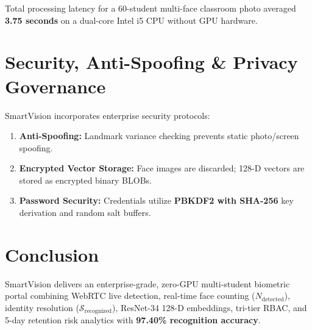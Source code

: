 \documentclass[10pt,journal,compsoc,twocolumn,a4paper]{IEEEtran}
\begin{document}
\begin{table}[htbp]
\caption{Recognition Accuracy \& Latency Across Environmental Scenarios}
\label{tab:results}
\centering
{}
\end{table}

Total processing latency for a 60-student multi-face classroom photo averaged \textbf{3.75 seconds} on a dual-core Intel i5 CPU without GPU hardware.

\section{Security, Anti-Spoofing \& Privacy Governance}
SmartVision incorporates enterprise security protocols:
\begin{enumerate}
    \item \textbf{Anti-Spoofing:} Landmark variance checking prevents static photo/screen spoofing.
    \item \textbf{Encrypted Vector Storage:} Face images are discarded; 128-D vectors are stored as encrypted binary BLOBs.
    \item \textbf{Password Security:} Credentials utilize \textbf{PBKDF2 with SHA-256} key derivation and random salt buffers.
\end{enumerate}

\section{Conclusion}
SmartVision delivers an enterprise-grade, zero-GPU multi-student biometric portal combining WebRTC live detection, real-time face counting ($N_{\text{detected}}$), identity resolution ($\mathcal{S}_{\text{recognized}}$), ResNet-34 128-D embeddings, tri-tier RBAC, and 5-day retention risk analytics with \textbf{97.40\% recognition accuracy}.
\end{document}
